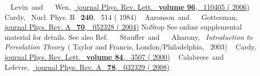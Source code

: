 \documentclass[prl,twocolumn,aps,showpacs,amsmath,amssymb,superscriptaddress,floatfix,longbibliography]{revtex4-1}
\begin{document}
\begin{thebibliography}{39}
   { {~\bibnamefont
  {Levin}}\ and\  {\ \bibnamefont
  {Wen}},\ }\href {\doibase 10.1103/PhysRevLett.96.110405} {\bibfield
  {journal} { {Phys. Rev. Lett.}\ }\textbf {\bibinfo
  {volume} {96}},\  {110405} (
  {2006})}\BibitemOpen
   { {\ \bibnamefont
  {Cardy}},\ }\href@noop {} { { {Nucl.
  Phys. B}\ }\textbf { {240}},\  {514}
  ( {1984})}\BibitemOpen
   { {~\bibnamefont
  {Aaronson}}\ and\  {~\bibnamefont
  {Gottesman}},\ }\href {\doibase 10.1103/PhysRevA.70.052328} {\bibfield
  {journal} { {Phys. Rev. A}\ }\textbf {
  {70}},\  {052328} ( {2004})}\BibitemShut
  {NoStop}\BibitemOpen
  \href@noop {} {} {See online supplemental material for
  details. See also Ref.~\cite{Ito1993,kz}}\BibitemOpen
   { {~\bibnamefont
  {Stauffer}}\ and\  {~\bibnamefont
  {Aharony}},\ }\href@noop {} {\emph { {Introduction to
  Percolation Theory}}}\ ( {Taylor and Francis,
  London/Philadelphia},\  {2003})\BibitemOpen
   { {~\bibnamefont
  {Cardy}},\ }\href {\doibase 10.1103/PhysRevLett.84.3507} {\bibfield
  {journal} { {Phys. Rev. Lett.}\ }\textbf {\bibinfo
  {volume} {84}},\  {3507} (
  {2000})}\BibitemOpen
   { {~\bibnamefont
  {Calabrese}}\ and\  {~\bibnamefont
  {Lefevre}},\ }\href {\doibase 10.1103/PhysRevA.78.032329} {\bibfield
  {journal} { {Phys. Rev. A}\ }\textbf {
  {78}},\  {032329} ( {2008})}\BibitemShut

\end{thebibliography}
\end{document}
